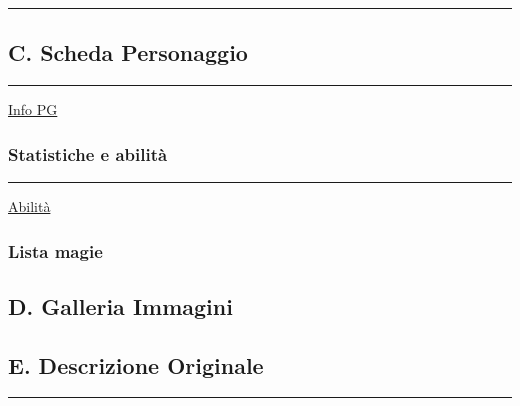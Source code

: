 \begin{center}\rule{0.5\linewidth}{0.5pt}\end{center}

\href{Untitled\%20e0d60c2d83e941dd841eefba865eae94.csv}{}

\subsection{C. Scheda Personaggio}\label{c.-scheda-personaggio}

\begin{center}\rule{0.5\linewidth}{0.5pt}\end{center}

\href{Info\%20PG\%207a1ec0c7056346e58f34bcb4bc4584e6.csv}{Info PG}

\subsubsection{Statistiche e abilità}\label{statistiche-e-abilituxe0}

\begin{center}\rule{0.5\linewidth}{0.5pt}\end{center}

\href{Abilita\%CC\%80\%20c479ff405d254668aa27bdd208fc8034.csv}{Abilità}

\subsubsection{Lista magie}\label{lista-magie}

\subsection{D. Galleria Immagini}\label{d.-galleria-immagini}

\subsection{E. Descrizione Originale}\label{e.-descrizione-originale}

\begin{center}\rule{0.5\linewidth}{0.5pt}\end{center}
